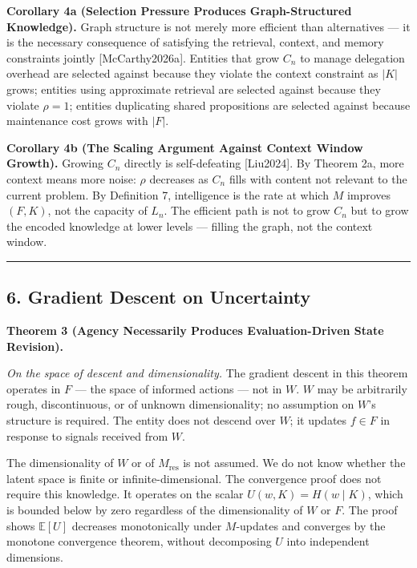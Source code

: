 \documentclass[
]{article}
\begin{document}
\textbf{Corollary 4a (Selection Pressure Produces Graph-Structured
Knowledge).} Graph structure is not merely more efficient than
alternatives --- it is the necessary consequence of satisfying the
retrieval, context, and memory constraints jointly
{[}McCarthy2026a{]}. Entities that grow \(C_n\) to manage delegation
overhead are selected against because they violate the context constraint
as \(|K|\) grows; entities using approximate retrieval are selected
against because they violate \(\rho = 1\); entities duplicating shared
propositions are selected against because maintenance cost grows with
\(|F|\).

\textbf{Corollary 4b (The Scaling Argument Against Context Window
Growth).} Growing \(C_n\) directly is self-defeating {[}Liu2024{]}.
By Theorem 2a, more context means more noise: \(\rho\) decreases as
\(C_n\) fills with content not relevant to the current problem.
By Definition 7, intelligence is the rate at which \(M\) improves
\((F, K)\), not the capacity of \(L_n\). The efficient path is not to
grow \(C_n\) but to grow the encoded knowledge at lower levels ---
filling the graph, not the context window.

\begin{center}\rule{0.5\linewidth}{0.5pt}\end{center}

\subsection{6. Gradient Descent on
Uncertainty}\label{gradient-descent-on-uncertainty}

\textbf{Theorem 3 (Agency Necessarily Produces Evaluation-Driven State
Revision).}

\emph{On the space of descent and dimensionality.} The gradient descent
in this theorem operates in \(F\) --- the space of informed actions ---
not in \(W\). \(W\) may be arbitrarily rough, discontinuous, or of
unknown dimensionality; no assumption on \(W\)'s structure is required.
The entity does not descend over \(W\); it updates \(f \in F\) in
response to signals received from \(W\).

The dimensionality of \(W\) or of \(M_{\text{res}}\) is not assumed. We
do not know whether the latent space is finite or infinite-dimensional.
The convergence proof does not require this knowledge. It operates on
the scalar \(U(w, K) = H(w \mid K)\), which is bounded below by zero
regardless of the dimensionality of \(W\) or \(F\). The proof shows
\(\mathbb{E}[U]\) decreases monotonically under \(M\)-updates and
converges by the monotone convergence theorem, without decomposing \(U\)
into independent dimensions.
\end{document}
